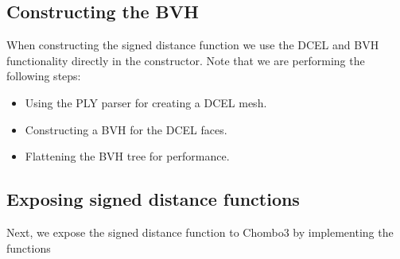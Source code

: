 \documentclass[letterpaper,10pt,english]{sphinxmanual}
\begin{document}
\begin{sphinxVerbatim}[commandchars=\\\{\}]
                         
         

   
   

   
\end{sphinxVerbatim}


\subsection{Constructing the BVH}
\label{\detokenize{Example_Chombo3:constructing-the-bvh}}
\sphinxAtStartPar
When constructing the signed distance function we use the DCEL and BVH functionality directly in the constructor.
Note that we are performing the following steps:
\begin{itemize}
\item {} 
\sphinxAtStartPar
Using the PLY parser for creating a DCEL mesh.

\item {} 
\sphinxAtStartPar
Constructing a BVH for the DCEL faces.

\item {} 
\sphinxAtStartPar
Flattening the BVH tree for performance.

\end{itemize}


\subsection{Exposing signed distance functions}
\label{\detokenize{Example_Chombo3:exposing-signed-distance-functions}}
\sphinxAtStartPar
Next, we expose the signed distance function to Chombo3 by implementing the functions
\end{document}
